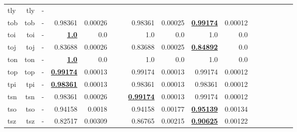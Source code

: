 \documentclass[11pt]{article}
\begin{document}
\begin{table*}[h]
{\begin{tabular}{lrrrrrrrrrrrrrrrr}
tly         & tly         & -         &          &          &          &          &          &          &          &          &          &          &          &          \\
tob         & tob         & -         & 0.98361         & 0.00026         &          &          & 0.98361         & 0.00025         & \textbf{\underline{0.99174}}         & 0.00012         &          &          &          &          \\
toi         & toi         & -         & \textbf{\underline{1.0}}         & 0.0         &          &          & 1.0         & 0.0         & 1.0         & 0.0         &          &          &          &          \\
toj         & toj         & -         & 0.83688         & 0.00026         &          &          & 0.83688         & 0.00025         & \textbf{\underline{0.84892}}         & 0.0         &          &          &          &          \\
ton         & ton         & -         & \textbf{\underline{1.0}}         & 0.0         &          &          & 1.0         & 0.0         & 1.0         & 0.0         &          &          &          &          \\
top         & top         & -         & \textbf{\underline{0.99174}}         & 0.00013         &          &          & 0.99174         & 0.00013         & 0.99174         & 0.00012         &          &          &          &          \\
tpi         & tpi         & -         & \textbf{\underline{0.98361}}         & 0.00013         &          &          & 0.98361         & 0.00013         & 0.98361         & 0.00012         &          &          &          &          \\
tsn         & tsn         & -         & 0.98361         & 0.00026         &          &          & \textbf{\underline{0.99174}}         & 0.00013         & 0.99174         & 0.00012         &          &          &          &          \\
tso         & tso         & -         & 0.94158         & 0.0018         &          &          & 0.94158         & 0.00177         & \textbf{\underline{0.95139}}         & 0.00134         &          &          &          &          \\
tsz         & tsz         & -         & 0.82517         & 0.00309         &          &          & 0.86765         & 0.00215         & \textbf{\underline{0.90625}}         & 0.00122         &          &          &          &          \\

\end{tabular}}
\end{table*}
\end{document}
